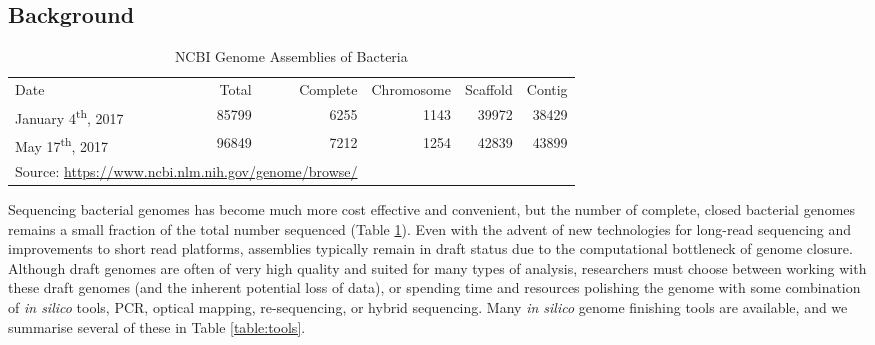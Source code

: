 \documentclass[10pt]{article}
\makeatletter
\newcommand{\ra}[1]{\renewcommand{\arraystretch}{#1}}
\newcommand{\cmidrules}[1]{%
  \noalign{%
    \global\MD@cmidrules={}%
    \toks@={\cmidrule(l{.3\tabcolsep}r{.3\tabcolsep})}%
    \count@=\z@
    \loop\ifnum\count@<#1\relax
      \advance\count@\@ne
      \edef\MD@temp{\the\toks@{\the\count@-\the\count@}}%
      \global\MD@cmidrules\expandafter{\the\expandafter\MD@cmidrules\MD@temp}%
    \repeat
  }%
  \the\MD@cmidrules
}
\makeatother
\begin{document}
\begin{linenumbers}


\section*{Background}

\begin{table}[!b]
  \centering
  \ra{1.3}
  \caption{NCBI Genome Assemblies of Bacteria}
  \label{table:completions}
  \begin{tabular}{lrrrrr}
    \toprule
    Date & Total & Complete & Chromosome & Scaffold & Contig \\
    \cmidrules{6}
    January 4\textsuperscript{th}, 2017 & 85799 & 6255 & 1143 & 39972 & 38429  \\
    May 17\textsuperscript{th}, 2017 & 96849 & 7212 & 1254 & 42839 & 43899\\
    \bottomrule
    \multicolumn{3}{l}{\tiny Source: \url{https://www.ncbi.nlm.nih.gov/genome/browse/}}
  \end{tabular}
\end{table}

Sequencing bacterial genomes has become much more cost effective and convenient, but the number of complete, closed bacterial genomes remains a small fraction of the total number sequenced (Table \ref{table:completions}). Even with the advent of new technologies for long-read sequencing and improvements to short read platforms, assemblies typically remain in draft status due to the computational bottleneck of genome closure\cite{Nagarajan2010,Brouwer2016}. Although draft genomes are often of very high quality and suited for many types of analysis, researchers must choose between working with these draft genomes (and the inherent potential loss of data), or spending time and resources polishing the genome with some combination of \textit{in silico} tools, PCR, optical mapping, re-sequencing, or hybrid sequencing\cite{Nagarajan2010,Utturkar2014}. Many \textit{in silico} genome finishing tools are available, and we summarise several of these in Table \ref{table:tools}.



\end{linenumbers}
\end{document}
